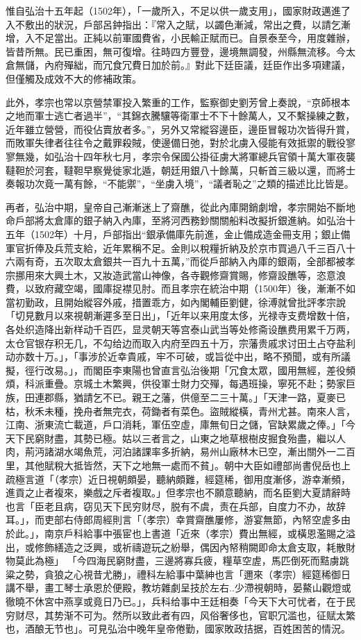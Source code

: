 惟自弘治十五年起（1502年），「一歲所入，不足以供一歲支用」，國家財政邁進了入不敷出的狀況，戶部呂鈡指出：『常入之賦，以蠲色漸減，常出之費，以請乞漸增，入不足當出。正純以前軍國費省，小民輸正賦而已。自景泰至今，用度雜辦，皆昔所無。民已重困，無可復增。往時四方豐登，邊境無調發，州縣無流移。今太倉無儲，內府殫絀，而冗食冗費日加於前。』對此下廷臣議，廷臣作出多項建議，但僅觸及成效不大的修補政策。

此外，孝宗也常以京營禁軍投入繁重的工作，監察御史劉芳曾上奏說，“京師根本之地而軍士逃亡者過半”，“其錦衣騰驤等衛軍士不下十餘萬人，又不繫操練之數，近年雖立營營，而役佔賣放者多。”，另外又常縱容邊臣，邊臣冒報功次皆得升賞，而敗軍失律者往往令之戴罪殺賊，使邊備日弛，對於北虜入侵能有效抵禦的戰役寥寥無幾，如弘治十四年秋七月，孝宗令保國公掛征虜大將軍總兵官領十萬大軍夜襲韃靼於河套，韃靼早察覺徙家北遁，朝廷用銀八十餘萬，只斬首三級以還，而將士奏報功次竟一萬有餘，“不能禦”，“坐虜入境”，“議者恥之”之類的描述比比皆是。

再者，弘治中期，皇帝自己漸漸迷上了齋醮，從此內庫開銷劇增，孝宗開始不斷地命戶部將太倉庫的銀子納入內庫，至將河西務鈔關關船料改擬折銀進納。如弘治十五年（1502年）十月，戶部指出“銀承備庫先前進，金止備成造金冊支用；銀止備軍官折俸及兵荒支給，近年累稱不足。金則以稅糧折納及於京市買過八千三百八十六兩有奇，五次取太倉銀共一百九十五萬，”而從戶部納入內庫的銀兩，全部都被孝宗挪用來大興土木，又妝造武當山神像，各寺觀修齋賞賜，修齋設醮等，恣意浪費，以致府藏空竭，國庫捉襟见肘。而且孝宗在統治中期（1500年）後，漸漸不如當初勤政，且開始縱容外戚，措置乖方，如內閣輔臣劉健，徐溥就曾批評孝宗說「切見數月以來視朝漸遲多至日出」，「近年以来用度太侈，光禄寺支费增数十倍，各处织造降出新样动千百匹，显灵朝天等宫泰山武当等处修斋设醮费用累千万两，太仓官银存积无几，不勾给边而取入内府至四五十万，宗藩贵戚求讨田土占夺盐利动亦数十万。」，「事涉於近幸貴戚，牢不可破，或旨從中出，略不預聞，或有所議擬，徑行改易。」，而閣臣李東陽也曾直言弘治後期「冗食太眾，國用無經，差役頻煩，科派重疊。京城土木繁興，供役軍士財力交殫，每遇班操，寧死不赴；勢家巨族，田連郡縣，猶請乞不已。親王之藩，供億至二三十萬。」「天津一路，夏麥已枯，秋禾未種，挽舟者無完衣，荷鋤者有菜色。盜賊縱橫，青州尤甚。南來人言，江南、浙東流亡載道，戶口消耗，軍伍空虛，庫無旬日之儲，官缺累歲之俸。」「今天下民窮財盡，其勢已極。姑以三者言之，山東之地草根樹皮掘食殆盡，繼以人肉，荊沔諸湖水竭魚荒，河泊諸課率多折納，易州山廠林木已空，漸出關外一二百里，其他賦稅大抵皆然，天下之地無一處而不貧」。朝中大臣如禮部尚書倪岳也上疏極言道「（孝宗）近日視朝頗晏，聽納頗難，經筵稀，御用度漸侈，游幸漸頻，進貢之止者複來，樂戲之斥者複取。」但孝宗也不願意聽納，而名臣劉大夏請辭時也言「臣老且病，窃见天下民穷财尽，脱有不虞，责在兵部，自度力不办，故辞耳。」，而吏部右侍郎周經則言「（孝宗）幸賞齋醮屢修，游宴無節，內帑空虗多由於此。」，南京戶科給事中張宦也上書道「近來（孝宗）費出無經，或橫恩濫賜之溢出，或修飾繕造之泛興，或祈禱遊玩之紛舉，偶因內帑稍闕即命太倉支取，耗散財物莫此為極」 「今四海民窮財盡，三邊將寡兵疲，糧草空虗，馬匹倒死而黠虜跳粱之勢，貪狼之心視昔尤勝」，禮科左給事中葉紳也言「邇來（孝宗）經筵稀御日講不舉，畫工琴士承恩於便殿，教坊雜劇呈技於左右..少滯視朝時，晏鰲山觀燈或徹曉不休宮中燕享或竟日乃已。」，兵科给事中王廷相奏「今天下大可忧者，在于民穷财尽，其势渐不可为。然所以致此者有四，风俗奢侈也，官职冗滥也，征赋太繁也，酒酿无节也」。可見弘治中晚年皇帝倦勤，國家敗政拮据，百姓困苦的情況。

